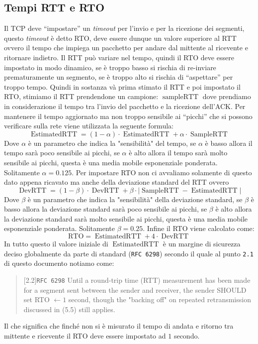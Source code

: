     \subsection[Tempi \texttt{RTT} e \texttt{RTO}]{Tempi \Acrshort*{RTT} e \Acrshort*{RTO}}
        Il \Acrshort*{TCP} deve ``impostare'' un \textit{timeout} per l'invio e per la ricezione dei segmenti, questo \textit{timeout} è detto \Acrfull*{RTO}, deve essere dunque un valore superiore al \Acrfull*{RTT} ovvero il tempo che impiega un pacchetto per andare dal mittente al ricevente e ritornare indietro. Il \Acrshort*{RTT} può variare nel tempo, quindi il \Acrshort*{RTO} deve essere impostato in modo dinamico, se è troppo basso si rischia di re-inviare prematuramente un segmento, se è troppo alto si rischia di ``aspettare'' per troppo tempo. Quindi in sostanza và prima stimato il \Acrshort*{RTT} e poi impostato il \Acrshort*{RTO}, stimiamo il \Acrshort*{RTT} prendendone un campione: $\operatorname{sampleRTT}$ dove prendiamo in considerazione il tempo tra l'invio del pacchetto e la ricezione dell'\Acrshort*{ACK}. Per mantenere il tempo aggiornato ma non troppo sensibile ai ``picchi'' che si possono verificare sulla rete viene utilizzata la seguente formula:
        \[ \operatorname{EstimatedRTT} = (1-\alpha) \cdot \operatorname{EstimatedRTT} + \alpha \cdot \operatorname{SampleRTT} \]
        Dove $ \alpha $ è un parametro che indica la "sensibilità" del tempo, se $ \alpha $ è basso allora il tempo sarà poco sensibile ai picchi, se $ \alpha $ è alto allora il tempo sarà molto sensibile ai picchi, questa è una media mobile esponenziale ponderata. Solitamente $ \alpha = 0.125 $.\newline
        Per impostare \Acrshort*{RTO} non ci avvaliamo solamente di questo dato appena ricavato ma anche della deviazione standard del \Acrshort*{RTT} ovvero 
        $$ \operatorname{DevRTT} = (1-\beta) \cdot \operatorname{DevRTT} + \beta \cdot \left| \operatorname{SampleRTT} - \operatorname{EstimatedRTT} \right| $$
        Dove $ \beta $ è un parametro che indica la "sensibilità" della deviazione standard, se $ \beta $ è basso allora la deviazione standard sarà poco sensibile ai picchi, se $ \beta $ è alto allora la deviazione standard sarà molto sensibile ai picchi, questa è una media mobile esponenziale ponderata. Solitamente $ \beta = 0.25 $.\newline
        Infine il \Acrshort*{RTO} viene calcolato come: 
        $$ \text{RTO} = \operatorname{EstimatedRTT} + 4 \cdot \operatorname{DevRTT} $$
        In tutto questo il valore iniziale di $\operatorname{EstimatedRTT}$ è un margine di sicurezza deciso globalmente da parte di standard (\texttt{\Acrshort*{RFC} 6298}) secondo il quale al punto \texttt{2.1} di questo documento notiamo come: 
        \begin{quote}[2.2]{\texttt{\Acrshort*{RFC} 6298}}
            Until a round-trip time (RTT) measurement has been made for a segment sent between the sender and receiver, the sender SHOULD set RTO $\leftarrow 1$ second, though the "backing off" on repeated retransmission discussed in (5.5) still applies.
        \end{quote}
        Il che significa che finché non si è misurato il tempo di andata e ritorno tra mittente e ricevente il \Acrshort*{RTO} deve essere impostato ad $1$ secondo.
